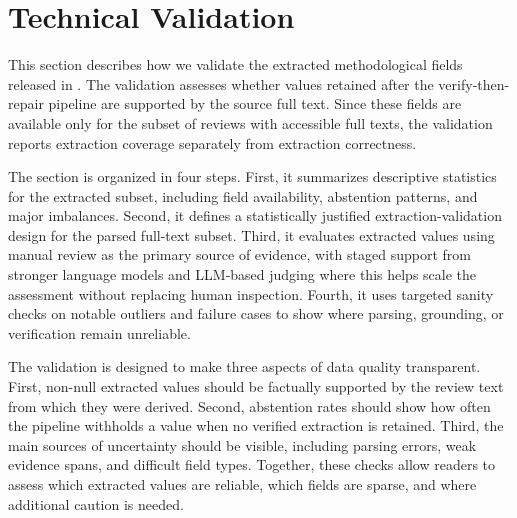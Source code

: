 \section*{Technical Validation}

This section describes how we validate the extracted methodological fields released in \webisSRCorpus{}. The validation assesses whether values retained after the verify-then-repair pipeline are supported by the source full text. Since these fields are available only for the subset of reviews with accessible full texts, the validation reports extraction coverage separately from extraction correctness.

The section is organized in four steps. First, it summarizes descriptive statistics for the extracted subset, including field availability, abstention patterns, and major imbalances. Second, it defines a statistically justified extraction-validation design for the parsed full-text subset. Third, it evaluates extracted values using manual review as the primary source of evidence, with staged support from stronger language models and LLM-based judging where this helps scale the assessment without replacing human inspection. Fourth, it uses targeted sanity checks on notable outliers and failure cases to show where parsing, grounding, or verification remain unreliable.

The validation is designed to make three aspects of data quality transparent. First, non-null extracted values should be factually supported by the review text from which they were derived. Second, abstention rates should show how often the pipeline withholds a value when no verified extraction is retained. Third, the main sources of uncertainty should be visible, including parsing errors, weak evidence spans, and difficult field types. Together, these checks allow readers to assess which extracted values are reliable, which fields are sparse, and where additional caution is needed.
